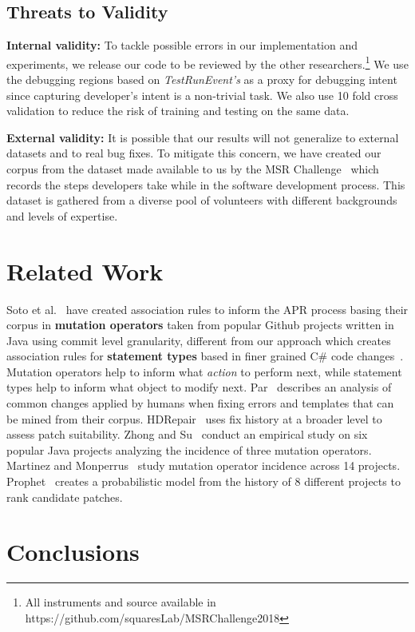 \documentclass[sigconf]{acmart}
\begin{document}
\subsection{Threats to Validity}
\noindent\textbf{Internal validity:}
To tackle possible errors in our implementation and experiments, we release our code
to be reviewed by the other researchers.\footnote{All instruments
and source available in
https://github.com/squaresLab/MSRChallenge2018} We use 
the debugging regions based on \textit{TestRunEvent's} as a 
proxy for debugging intent since capturing developer's intent 
is a non-trivial task.
We also use 10 fold cross validation 
to reduce the risk of training and testing on the same data.  

\noindent\textbf{External validity:} 
It is possible 
that our results will not generalize to external datasets and to
real bug fixes. To mitigate this concern, we have created our corpus 
from the dataset made available to us by the MSR Challenge~\cite{msr18challenge}
which records the steps developers take while in the software development process.
This dataset is gathered from a diverse pool of volunteers with different 
backgrounds and levels of expertise.


\section{ Related Work} 
Soto et al.~\cite{Soto18} have created association rules to inform the APR
process basing their corpus in \textbf{mutation operators} taken from popular Github projects
written in Java using commit level granularity, 
different from our approach which creates association rules for \textbf{statement types} 
based in finer grained C\# code changes~\cite{msr18challenge}. Mutation operators help to 
inform what \textit{action} to perform next, while statement types help to inform what
object to modify next. 
Par~\cite{kim2013} describes an analysis of common changes
applied by humans when fixing errors and templates that can be mined from
their corpus. HDRepair~\cite{xuan16} 
uses fix history at a broader level
to assess patch suitability.
Zhong and Su~\cite{zhong15} conduct an empirical study on six popular Java 
projects analyzing the incidence of three mutation operators. 
Martinez and
Monperrus~\cite{martinez15} study mutation operator incidence across 
14 projects.
Prophet~\cite{long16proph} creates a
probabilistic model from 
the history of 8 different projects to rank candidate
patches.


\section{Conclusions}
\label{conclusions}
\end{document}
